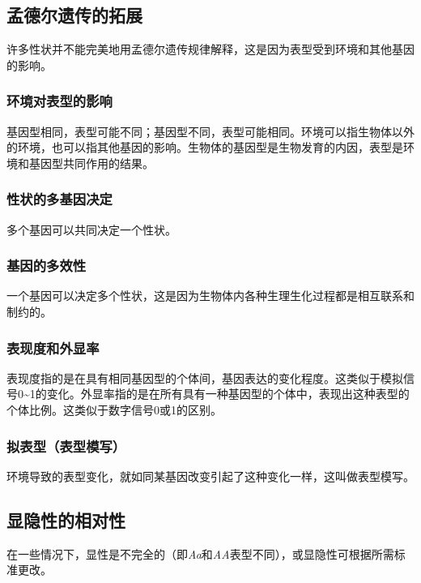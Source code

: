 \subsection{孟德尔遗传的拓展}

许多性状并不能完美地用孟德尔遗传规律解释，这是因为表型受到环境和其他基因的影响。

\subsubsection{环境对表型的影响}

基因型相同，表型可能不同；基因型不同，表型可能相同。环境可以指生物体以外的环境，也可以指其他基因的影响。生物体的基因型是生物发育的内因，表型是环境和基因型共同作用的结果。

\subsubsection{性状的多基因决定}

多个基因可以共同决定一个性状。

\subsubsection{基因的多效性}

一个基因可以决定多个性状，这是因为生物体内各种生理生化过程都是相互联系和制约的。

\subsubsection{表现度和外显率}

表现度指的是在具有相同基因型的个体间，基因表达的变化程度。这类似于模拟信号0\textasciitilde1的变化。外显率指的是在所有具有一种基因型的个体中，表现出这种表型的个体比例。这类似于数字信号0或1的区别。

\subsubsection{拟表型（表型模写）}

环境导致的表型变化，就如同某基因改变引起了这种变化一样，这叫做表型模写。

\subsection{显隐性的相对性}

在一些情况下，显性是不完全的（即\textit{Aa}和\textit{AA}表型不同），或显隐性可根据所需标准更改。

